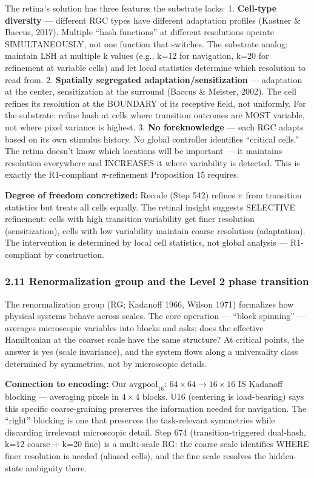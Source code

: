 \documentclass[
  11pt,
]{article}
\begin{document}
The retina's solution has three features the substrate lacks: 1.
\textbf{Cell-type diversity} --- different RGC types have different
adaptation profiles (Kastner \& Baccus, 2017). Multiple ``hash
functions'' at different resolutions operate SIMULTANEOUSLY, not one
function that switches. The substrate analog: maintain LSH at multiple k
values (e.g., k=12 for navigation, k=20 for refinement at variable
cells) and let local statistics determine which resolution to read from.
2. \textbf{Spatially segregated adaptation/sensitization} --- adaptation
at the center, sensitization at the surround (Baccus \& Meister, 2002).
The cell refines its resolution at the BOUNDARY of its receptive field,
not uniformly. For the substrate: refine hash at cells where transition
outcomes are MOST variable, not where pixel variance is highest. 3.
\textbf{No foreknowledge} --- each RGC adapts based on its own stimulus
history. No global controller identifies ``critical cells.'' The retina
doesn't know which locations will be important --- it maintains
resolution everywhere and INCREASES it where variability is detected.
This is exactly the R1-compliant \(\pi\)-refinement Proposition 15
requires.

\textbf{Degree of freedom concretized:} Recode (Step 542) refines
\(\pi\) from transition statistics but treats all cells equally. The
retinal insight suggests SELECTIVE refinement: cells with high
transition variability get finer resolution (sensitization), cells with
low variability maintain coarse resolution (adaptation). The
intervention is determined by local cell statistics, not global analysis
--- R1-compliant by construction.

\subsubsection{2.11 Renormalization group and the Level 2 phase
transition}\label{renormalization-group-and-the-level-2-phase-transition}

The renormalization group (RG; Kadanoff 1966, Wilson 1971) formalizes
how physical systems behave across scales. The core operation ---
``block spinning'' --- averages microscopic variables into blocks and
asks: does the effective Hamiltonian at the coarser scale have the same
structure? At critical points, the answer is yes (scale invariance), and
the system flows along a universality class determined by symmetries,
not by microscopic details.

\textbf{Connection to encoding:} Our \(\text{avgpool}_{16}\):
\(64 \times 64 \to 16 \times 16\) IS Kadanoff blocking --- averaging
pixels in \(4 \times 4\) blocks. U16 (centering is load-bearing) says
this specific coarse-graining preserves the information needed for
navigation. The ``right'' blocking is one that preserves the
task-relevant symmetries while discarding irrelevant microscopic detail.
Step 674 (transition-triggered dual-hash, k=12 coarse + k=20 fine) is a
multi-scale RG: the coarse scale identifies WHERE finer resolution is
needed (aliased cells), and the fine scale resolves the hidden-state
ambiguity there.
\end{document}
